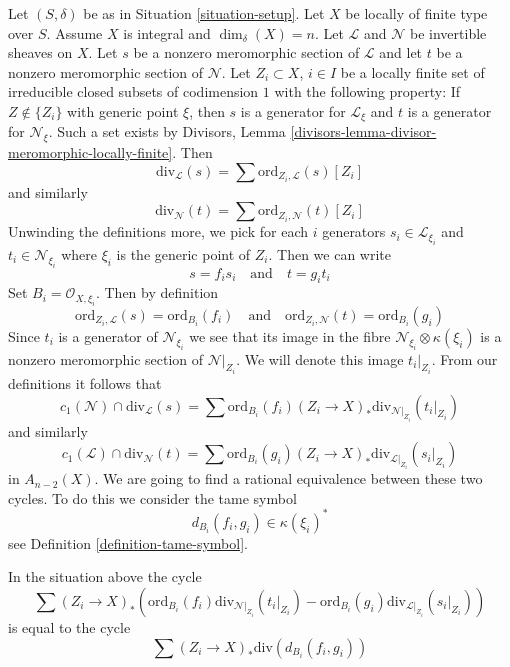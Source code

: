 \noindent
Let $(S, \delta)$ be as in Situation \ref{situation-setup}.
Let $X$ be locally of finite type over $S$. Assume
$X$ is integral and $\dim_\delta(X) = n$.
Let $\mathcal{L}$ and $\mathcal{N}$ be invertible sheaves on $X$.
Let $s$ be a nonzero meromorphic section of $\mathcal{L}$ and
let $t$ be a nonzero meromorphic section of $\mathcal{N}$.
Let $Z_i \subset X$, $i \in I$ be a locally finite set of irreducible
closed subsets of codimension $1$ with the following property:
If $Z \not \in \{Z_i\}$ with generic point $\xi$, then $s$ is a generator
for $\mathcal{L}_\xi$ and $t$ is a generator for $\mathcal{N}_\xi$.
Such a set exists by
Divisors, Lemma \ref{divisors-lemma-divisor-meromorphic-locally-finite}.
Then
$$
\text{div}_\mathcal{L}(s) = \sum \text{ord}_{Z_i, \mathcal{L}}(s) [Z_i]
$$
and similarly
$$
\text{div}_\mathcal{N}(t) = \sum \text{ord}_{Z_i, \mathcal{N}}(t) [Z_i]
$$
Unwinding the definitions more, we pick for each $i$ generators
$s_i \in \mathcal{L}_{\xi_i}$ and $t_i \in \mathcal{N}_{\xi_i}$
where $\xi_i$ is the generic point of $Z_i$. Then we can write
$$
s = f_i s_i
\quad\text{and}\quad
t = g_i t_i
$$
Set $B_i = \mathcal{O}_{X, \xi_i}$. Then by definition
$$
\text{ord}_{Z_i, \mathcal{L}}(s) = \text{ord}_{B_i}(f_i)
\quad\text{and}\quad
\text{ord}_{Z_i, \mathcal{N}}(t) = \text{ord}_{B_i}(g_i)
$$
Since $t_i$ is a generator of $\mathcal{N}_{\xi_i}$ we see that
its image in the fibre $\mathcal{N}_{\xi_i} \otimes \kappa(\xi_i)$
is a nonzero meromorphic section of $\mathcal{N}|_{Z_i}$. We will denote
this image $t_i|_{Z_i}$. From our definitions it follows that
$$
c_1(\mathcal{N}) \cap \text{div}_\mathcal{L}(s) =
\sum \text{ord}_{B_i}(f_i)
(Z_i \to X)_*\text{div}_{\mathcal{N}|_{Z_i}}(t_i|_{Z_i})
$$
and similarly
$$
c_1(\mathcal{L}) \cap \text{div}_\mathcal{N}(t) =
\sum \text{ord}_{B_i}(g_i)
(Z_i \to X)_*\text{div}_{\mathcal{L}|_{Z_i}}(s_i|_{Z_i})
$$
in $A_{n - 2}(X)$. We are going to find a rational equivalence between
these two cycles. To do this we consider the tame symbol
$$
d_{B_i}(f_i, g_i) \in \kappa(\xi_i)^*
$$
see Definition \ref{definition-tame-symbol}.

\begin{lemma}
\label{lemma-key-formula}
In the situation above the cycle
$$
\sum
(Z_i \to X)_*\left(
\text{ord}_{B_i}(f_i) \text{div}_{\mathcal{N}|_{Z_i}}(t_i|_{Z_i}) -
\text{ord}_{B_i}(g_i) \text{div}_{\mathcal{L}|_{Z_i}}(s_i|_{Z_i}) \right)
$$
is equal to the cycle
$$
\sum (Z_i \to X)_*\text{div}(d_{B_i}(f_i, g_i))
$$
\end{lemma}

